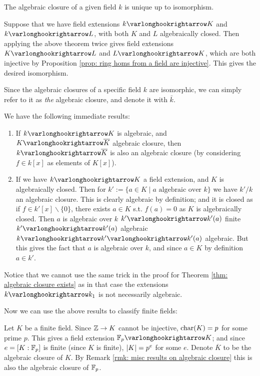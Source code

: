 \begin{corollary}\label{cor: algebraic closure is unique}
    The algebraic closure of a given field $k$ is unique up to isomorphism.

    Suppose that we have field extensions $k \ext K$ and $k \ext L$, with both $K$ and $L$ algebraically closed. Then applying the above theorem twice gives field extensions $K \ext L$ and $L \ext K$, which are both injective by Proposition \ref{prop: ring homs from a field are injective}. This gives the desired isomorphism.
\end{corollary}

\begin{notation}
    Since the algebraic closures of a specific field $k$ are isomorphic, we can simply refer to it as \emph{the} algebraic closure, and denote it with $\bar{k}$.
\end{notation}

\begin{remark}\label{rmk: misc results on algebraic closure}
    We have the following immediate results:
    \begin{enumerate}[label=\arabic*)]
        \item If $k \ext K$ is algebraic, and $K \ext \overline{K}$ algebraic closure, then $k \ext \overline{K}$ is also an algebraic closure (by considering $f \in k[x]$ as elements of $K[x]$).
        \item If we have $k \ext K$ a field extension, and $K$ is algebraically closed. Then for $k' := \{a \in K \mid \text{$a$ algebraic over $k$}\}$ we have $k'/k$ an algebraic closure. This is clearly algebraic by definition; and it is closed as if $f \in k'[x] \smallsetminus \{0\}$, there exists $a \in K$ s.t. $f(a) = 0$ as $K$ is algebraically closed. Then $a$ is algebraic over $k$ \implies $k' \ext k'(a)$ finite \implies $k' \ext k'(a)$ algebraic \implies $k \ext k' \ext k'(a)$ algebraic. But this gives the fact that $a$ is algebraic over $k$, and since $a \in K$ by definition $a \in k'$.  
    \end{enumerate}
    Notice that we cannot use the same trick in the proof for Theorem \ref{thm: algebraic closure exists} as in that case the extensions $k \ext k_1$ is not necessarily algebraic.
\end{remark}

\textstart
Now we can use the above results to classify finite fields:

Let $K$ be a finite field. Since $\mathbb{Z} \to K$ cannot be injective, $\mathrm{char}(K) = p$ for some prime $p$. This gives a field extension $\F_p \ext K$; and since $e = [K : \mathbb{F}_p]$ is finite (since $K$ is finite), $\left|K\right| = p^e$ for some $e$. Denote $\overline{K}$ to be the algebraic closure of $K$. By Remark \ref{rmk: misc results on algebraic closure} this is also the algebraic closure of $\mathbb{F}_p$.

